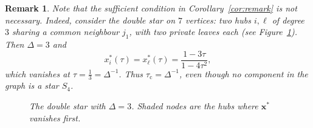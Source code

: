 \documentclass[a4paper,12pt]{article}
\newtheorem{remark}{Remark}
\begin{document}
\begin{remark}
    Note that the sufficient condition in Corollary~\ref{cor:remark} is not necessary.
    Indeed, consider the double star on $7$ vertices: two hubs $i, \ell$ of degree $3$ sharing a common neighbour $j_1$, with two private leaves each (see Figure~\ref{fig:double_star}). Then $\Delta = 3$ and
    \begin{equation*}
        x_i^*(\tau) = x_\ell^*(\tau) = \frac{1-3\tau}{1-4\tau^2},
    \end{equation*}
    which vanishes at $\tau = \tfrac{1}{3} = \Delta^{-1}$. Thus $\tau_{\mathrm{c}} = \Delta^{-1}$, even though no component in the graph is a star $S_4$.
    \begin{figure}[h!]
        \centering
        \caption{The double star with $\Delta = 3$. Shaded nodes are the hubs where $\mathbf{x^*}$ vanishes first.}
        \label{fig:double_star}
    \end{figure}
\end{remark}
\end{document}
